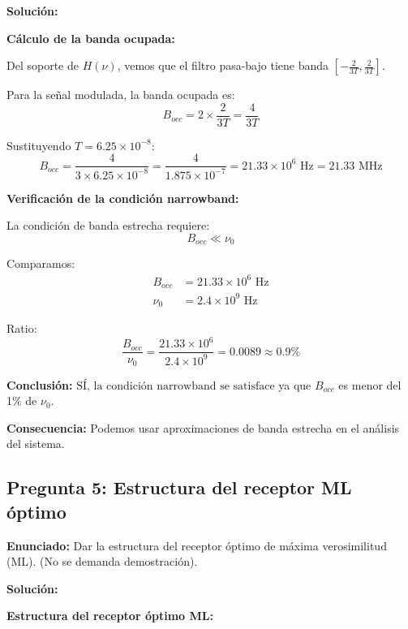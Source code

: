 \documentclass[11pt,a4paper]{article}
\begin{document}
\vspace{0.3cm}
\textbf{Soluci\'on:}

\textbf{C\'alculo de la banda ocupada:}

Del soporte de $H(\nu)$, vemos que el filtro pasa-bajo tiene banda $\left[-\frac{2}{3T}, \frac{2}{3T}\right]$.

Para la se\~nal modulada, la banda ocupada es:
\[
B_{occ} = 2 \times \frac{2}{3T} = \frac{4}{3T}
\]

Sustituyendo $T = 6.25 \times 10^{-8}$:
\[
B_{occ} = \frac{4}{3 \times 6.25 \times 10^{-8}} = \frac{4}{1.875 \times 10^{-7}} = \boxed{21.33 \times 10^6 \text{ Hz} = 21.33 \text{ MHz}}
\]

\textbf{Verificaci\'on de la condici\'on narrowband:}

La condici\'on de banda estrecha requiere:
\[
B_{occ} \ll \nu_0
\]

Comparamos:
\begin{align*}
B_{occ} &= 21.33 \times 10^6 \text{ Hz} \\
\nu_0 &= 2.4 \times 10^9 \text{ Hz}
\end{align*}

Ratio:
\[
\frac{B_{occ}}{\nu_0} = \frac{21.33 \times 10^6}{2.4 \times 10^9} = 0.0089 \approx 0.9\%
\]

\textbf{Conclusi\'on:} $\boxed{\text{SÍ, la condici\'on narrowband se satisface}}$ ya que $B_{occ}$ es menor del 1\% de $\nu_0$.

\textbf{Consecuencia:} Podemos usar aproximaciones de banda estrecha en el an\'alisis del sistema.



\subsection*{Pregunta 5: Estructura del receptor ML \'optimo}

\textbf{Enunciado:} Dar la estructura del receptor \'optimo de m\'axima verosimilitud (ML). (No se demanda demostraci\'on).

\vspace{0.3cm}
\textbf{Soluci\'on:}

\textbf{Estructura del receptor \'optimo ML:}
\end{document}
